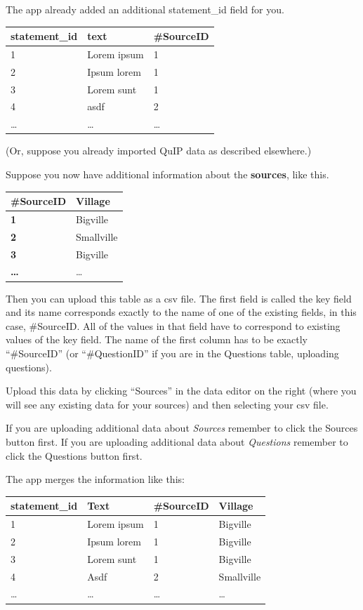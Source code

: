 \documentclass[
]{book}
\begin{document}
The app already added an additional statement\_id field for you.

\begin{longtable}[]{@{}lll@{}}
\toprule
\textbf{statement\_id} & \textbf{text} & \textbf{\#SourceID}\tabularnewline
\midrule
\endhead
1 & Lorem ipsum & 1\tabularnewline
2 & Ipsum lorem & 1\tabularnewline
3 & Lorem sunt & 1\tabularnewline
4 & asdf & 2\tabularnewline
\ldots{} & \ldots{} & \ldots{}\tabularnewline
\bottomrule
\end{longtable}

(Or, suppose you already imported QuIP data as described elsewhere.)

Suppose you now have additional information about the \textbf{sources}, like this.

\begin{longtable}[]{@{}ll@{}}
\toprule
\textbf{\#SourceID} & \textbf{Village}\tabularnewline
\midrule
\endhead
\textbf{1} & Bigville\tabularnewline
\textbf{2} & Smallville\tabularnewline
\textbf{3} & Bigville\tabularnewline
\textbf{\ldots{}} & \ldots{}\tabularnewline
\bottomrule
\end{longtable}

Then you can upload this table as a csv file. The first field is called the key field and its name corresponds exactly to the name of one of the existing fields, in this case, \#SourceID. All of the values in that field have to correspond to existing values of the key field. The name of the first column has to be exactly ``\#SourceID'' (or ``\#QuestionID'' if you are in the Questions table, uploading questions).

Upload this data by clicking ``Sources'' in the data editor on the right (where you will see any existing data for your sources) and then selecting your csv file.

If you are uploading additional data about \emph{Sources} remember to click the Sources button first. If you are uploading additional data about \emph{Questions} remember to click the Questions button first.

The app merges the information like this:

\begin{longtable}[]{@{}llll@{}}
\toprule
\textbf{statement\_id} & \textbf{Text} & \textbf{\#SourceID} & \textbf{Village}\tabularnewline
\midrule
\endhead
1 & Lorem ipsum & 1 & Bigville\tabularnewline
2 & Ipsum lorem & 1 & Bigville\tabularnewline
3 & Lorem sunt & 1 & Bigville\tabularnewline
4 & Asdf & 2 & Smallville\tabularnewline
\ldots{} & \ldots{} & \ldots{} & \ldots{}\tabularnewline
\bottomrule
\end{longtable}
\end{document}
